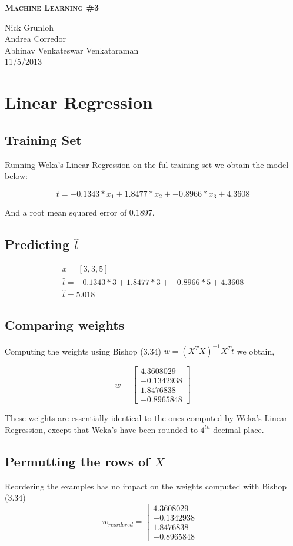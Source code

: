 \documentclass{article}
\newcommand{\header}[5]{
        \begin{minipage}[h!]{0.63\textwidth}
                \centering
                { \LARGE \textbf{ \textsc{#1} } }
        \end{minipage}
        \begin{minipage}[h!]{0.37\textwidth}
                \centering
                {#2}\\
                {#3}\\
        \end{minipage}
}
\begin{document}
\header{Machine Learning \#3}
       {Nick Grunloh\\Andrea Corredor\\Abhinav Venkateswar Venkataraman}
       {11/5/2013}
\\\\


\section{Linear Regression}

\subsection*{Training Set}
Running Weka's Linear Regression on the ful training set we obtain the model below:

 \[ t =    -0.1343 * x_{1} +  1.8477 * x_{2} + -0.8966 * x_{3} + 4.3608 \]

\noindent And a root mean squared error of $0.1897$. 

\subsection*{Predicting $\hat{t}$}

\begin{align*}
 x = [3,3,5]  \\
 \hat{t} = -0.1343 * 3 +  1.8477 * 3 + -0.8966 * 5 + 4.3608  \\
\hat{t} = 5.018 
\end{align*}

\subsection*{Comparing weights}
Computing the weights using Bishop (3.34) $ w = (X^{T}X)^{-1}X^{T}t$  we obtain,

\[w = \begin{bmatrix}
       4.3608029  \\[0.3em]
       -0.1342938  \\[0.3em]
       1.8476838 \\[0.3em]
       -0.8965848
     \end{bmatrix} \]

These weights are essentially identical to the ones computed by Weka's Linear Regression, except that Weka's have been rounded to $4^{th}$ decimal place.

\subsection*{Permutting the rows of $X$}
Reordering the examples has no impact on the weights computed with Bishop (3.34)
\[w_{reordered} = \begin{bmatrix}
       4.3608029  \\[0.3em]
       -0.1342938  \\[0.3em]
       1.8476838 \\[0.3em]
       -0.8965848
     \end{bmatrix} \]
\end{document}
